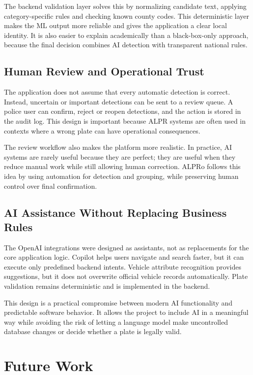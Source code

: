 ﻿\documentclass[12pt,a4paper]{article}
\begin{document}
The backend validation layer solves this by normalizing candidate text, applying category-specific rules and checking known county codes. This deterministic layer makes the ML output more reliable and gives the application a clear local identity. It is also easier to explain academically than a black-box-only approach, because the final decision combines AI detection with transparent national rules.

\subsection{Human Review and Operational Trust}

The application does not assume that every automatic detection is correct. Instead, uncertain or important detections can be sent to a review queue. A police user can confirm, reject or reopen detections, and the action is stored in the audit log. This design is important because ALPR systems are often used in contexts where a wrong plate can have operational consequences.

The review workflow also makes the platform more realistic. In practice, AI systems are rarely useful because they are perfect; they are useful when they reduce manual work while still allowing human correction. ALPRo follows this idea by using automation for detection and grouping, while preserving human control over final confirmation.

\subsection{AI Assistance Without Replacing Business Rules}

The OpenAI integrations were designed as assistants, not as replacements for the core application logic. Copilot helps users navigate and search faster, but it can execute only predefined backend intents. Vehicle attribute recognition provides suggestions, but it does not overwrite official vehicle records automatically. Plate validation remains deterministic and is implemented in the backend.

This design is a practical compromise between modern AI functionality and predictable software behavior. It allows the project to include AI in a meaningful way while avoiding the risk of letting a language model make uncontrolled database changes or decide whether a plate is legally valid.

\newpage
\section{Future Work}
\end{document}
